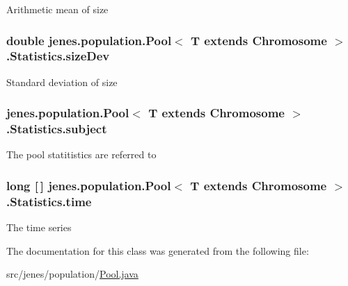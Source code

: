 Arithmetic mean of size \hypertarget{classjenes_1_1population_1_1_pool_3_01_t_01extends_01_chromosome_01_4_1_1_statistics_a5e9425e8a71d8c8c5fb60f40f9ab6ccb}{
\subsubsection[{size\-Dev}]{\setlength{\rightskip}{0pt plus 5cm}double jenes.\-population.\-Pool$<$ T extends Chromosome $>$.Statistics.\-size\-Dev\hspace{0.3cm}{\ttfamily [private]}}}\label{classjenes_1_1population_1_1_pool_3_01_t_01extends_01_chromosome_01_4_1_1_statistics_a5e9425e8a71d8c8c5fb60f40f9ab6ccb}
Standard deviation of size \hypertarget{classjenes_1_1population_1_1_pool_3_01_t_01extends_01_chromosome_01_4_1_1_statistics_a9c9248fce62b0bbe87da14bad1cd9d5c}{
\subsubsection[{subject}]{ jenes.\-population.\-Pool$<$ T extends Chromosome $>$.Statistics.\-subject\hspace{0.3cm}{\ttfamily [private]}}}\label{classjenes_1_1population_1_1_pool_3_01_t_01extends_01_chromosome_01_4_1_1_statistics_a9c9248fce62b0bbe87da14bad1cd9d5c}
The pool statitistics are referred to \hypertarget{classjenes_1_1population_1_1_pool_3_01_t_01extends_01_chromosome_01_4_1_1_statistics_a084dab030f1fc89a91940cb3816f58a1}{
\subsubsection[{time}]{\setlength{\rightskip}{0pt plus 5cm}long \mbox{[}$\,$\mbox{]} jenes.\-population.\-Pool$<$ T extends Chromosome $>$.Statistics.\-time\hspace{0.3cm}{\ttfamily [private]}}}\label{classjenes_1_1population_1_1_pool_3_01_t_01extends_01_chromosome_01_4_1_1_statistics_a084dab030f1fc89a91940cb3816f58a1}
The time series 

The documentation for this class was generated from the following file\-:\begin{DoxyCompactItemize}
\item 
src/jenes/population/\hyperlink{_pool_8java}{Pool.\-java}\end{DoxyCompactItemize}
